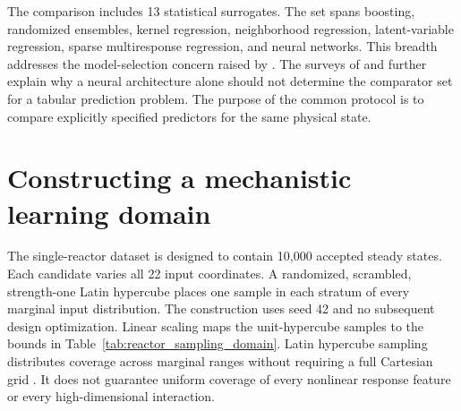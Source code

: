 The comparison includes 13 statistical surrogates. The set spans boosting, randomized ensembles, kernel regression, neighborhood regression, latent-variable regression, sparse multiresponse regression, and neural networks. This breadth addresses the model-selection concern raised by \citet{BhosekarIerapetritou2018}. The surveys of \citet{Borisov2024} and \citet{ShwartzZiv2022} further explain why a neural architecture alone should not determine the comparator set for a tabular prediction problem. The purpose of the common protocol is to compare explicitly specified predictors for the same physical state.

\section{Constructing a mechanistic learning domain}

The single-reactor dataset is designed to contain 10,000 accepted steady states. Each candidate varies all 22 input coordinates. A randomized, scrambled, strength-one Latin hypercube places one sample in each stratum of every marginal input distribution. The construction uses seed 42 and no subsequent design optimization. Linear scaling maps the unit-hypercube samples to the bounds in Table~\ref{tab:reactor_sampling_domain}. Latin hypercube sampling distributes coverage across marginal ranges without requiring a full Cartesian grid \citep{McKay1979}. It does not guarantee uniform coverage of every nonlinear response feature or every high-dimensional interaction.

